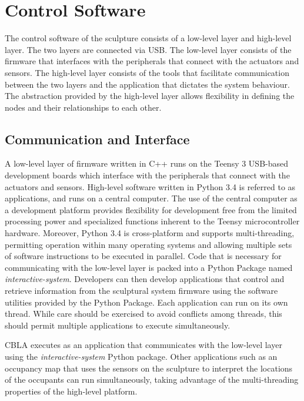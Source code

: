 \FloatBarrier
\section{Control Software}

The control software of the sculpture consists of a low-level layer and high-level layer. The two layers are connected via USB. The low-level layer consists of the firmware that interfaces with the peripherals that connect with the actuators and sensors. The high-level layer consists of the tools that facilitate communication between the two layers and the application that dictates the system behaviour. The abstraction provided by the high-level layer allows flexibility in defining the nodes and their relationships to each other. 

\subsection{Communication and Interface}

A low-level layer of firmware written in C++ runs on the Teensy 3 USB-based development boards which interface with the peripherals that connect with the actuators and sensors. High-level software written in Python 3.4 is referred to as applications, and runs on a central computer. The use of the central computer as a development platform provides flexibility for development free from the limited processing power and specialized functions inherent to the Teensy microcontroller hardware. Moreover, Python 3.4 is cross-platform and supports multi-threading, permitting operation within many operating systems and allowing multiple sets of software instructions to be executed in parallel. Code that is necessary for communicating with the low-level layer is packed into a Python Package named \textit{interactive-system}. Developers can then develop applications that control and retrieve information from the sculptural system firmware using the software utilities provided by the Python Package. Each application can run on its own thread. While care should be exercised to avoid conflicts among threads, this should permit multiple applications to execute simultaneously.	

CBLA executes as an application that communicates with the low-level layer using the \textit{interactive-system} Python package. Other applications such as an occupancy map that uses the sensors on the sculpture to interpret the locations of the occupants can run simultaneously, taking advantage of the multi-threading properties of the high-level platform.

